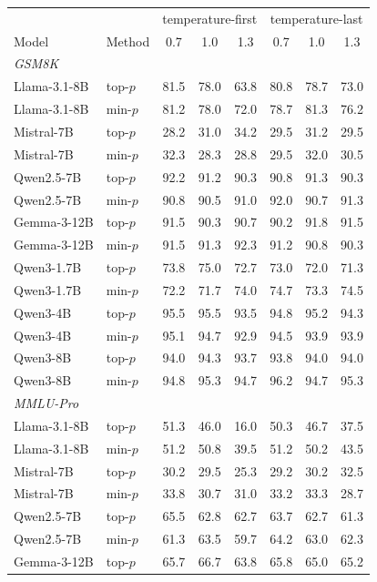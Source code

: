 \begin{tabular}{llcccccc}
\toprule
 & & \multicolumn{3}{c}{temperature-first} & \multicolumn{3}{c}{temperature-last} \\
Model & Method & 0.7 & 1.0 & 1.3 & 0.7 & 1.0 & 1.3 \\
\midrule
\multicolumn{8}{l}{\emph{GSM8K}} \\
Llama-3.1-8B & top-$p$ & 81.5 & 78.0 & 63.8 & 80.8 & 78.7 & 73.0 \\
Llama-3.1-8B & min-$p$ & 81.2 & 78.0 & 72.0 & 78.7 & 81.3 & 76.2 \\
Mistral-7B & top-$p$ & 28.2 & 31.0 & 34.2 & 29.5 & 31.2 & 29.5 \\
Mistral-7B & min-$p$ & 32.3 & 28.3 & 28.8 & 29.5 & 32.0 & 30.5 \\
Qwen2.5-7B & top-$p$ & 92.2 & 91.2 & 90.3 & 90.8 & 91.3 & 90.3 \\
Qwen2.5-7B & min-$p$ & 90.8 & 90.5 & 91.0 & 92.0 & 90.7 & 91.3 \\
Gemma-3-12B & top-$p$ & 91.5 & 90.3 & 90.7 & 90.2 & 91.8 & 91.5 \\
Gemma-3-12B & min-$p$ & 91.5 & 91.3 & 92.3 & 91.2 & 90.8 & 90.3 \\
Qwen3-1.7B & top-$p$ & 73.8 & 75.0 & 72.7 & 73.0 & 72.0 & 71.3 \\
Qwen3-1.7B & min-$p$ & 72.2 & 71.7 & 74.0 & 74.7 & 73.3 & 74.5 \\
Qwen3-4B & top-$p$ & 95.5 & 95.5 & 93.5 & 94.8 & 95.2 & 94.3 \\
Qwen3-4B & min-$p$ & 95.1 & 94.7 & 92.9 & 94.5 & 93.9 & 93.9 \\
Qwen3-8B & top-$p$ & 94.0 & 94.3 & 93.7 & 93.8 & 94.0 & 94.0 \\
Qwen3-8B & min-$p$ & 94.8 & 95.3 & 94.7 & 96.2 & 94.7 & 95.3 \\
\midrule
\multicolumn{8}{l}{\emph{MMLU-Pro}} \\
Llama-3.1-8B & top-$p$ & 51.3 & 46.0 & 16.0 & 50.3 & 46.7 & 37.5 \\
Llama-3.1-8B & min-$p$ & 51.2 & 50.8 & 39.5 & 51.2 & 50.2 & 43.5 \\
Mistral-7B & top-$p$ & 30.2 & 29.5 & 25.3 & 29.2 & 30.2 & 32.5 \\
Mistral-7B & min-$p$ & 33.8 & 30.7 & 31.0 & 33.2 & 33.3 & 28.7 \\
Qwen2.5-7B & top-$p$ & 65.5 & 62.8 & 62.7 & 63.7 & 62.7 & 61.3 \\
Qwen2.5-7B & min-$p$ & 61.3 & 63.5 & 59.7 & 64.2 & 63.0 & 62.3 \\
Gemma-3-12B & top-$p$ & 65.7 & 66.7 & 63.8 & 65.8 & 65.0 & 65.2 \\

\end{tabular}
